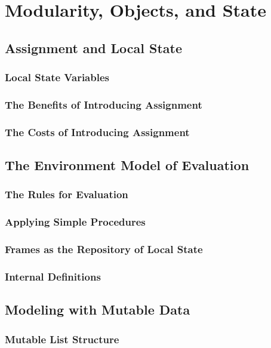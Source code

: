 %

    \section{Modularity, Objects, and State}
        \subsection{Assignment and Local State}
            \subsubsection{Local State Variables}
            \subsubsection{The Benefits of Introducing Assignment}
            \subsubsection{The Costs of Introducing Assignment}
        \subsection{The Environment Model of Evaluation}
            \subsubsection{The Rules for Evaluation}
            \subsubsection{Applying Simple Procedures}
            \subsubsection{Frames as the Repository of Local State}
            \subsubsection{Internal Definitions}
        \subsection{Modeling with Mutable Data}
            \subsubsection{Mutable List Structure}
